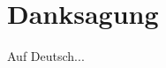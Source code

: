 \chapter*{Danksagung}
\label{sec:ack}

\begin{otherlanguage}{ngerman}
 Auf Deutsch... 
\end{otherlanguage}


